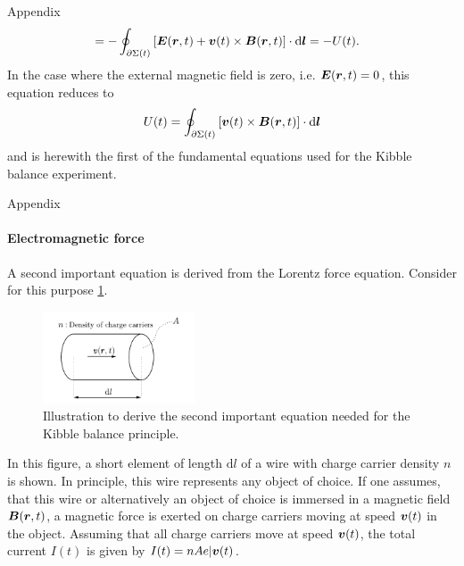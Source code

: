 \documentclass{beamer}
\begin{document}
\begin{frame}[allowframebreaks]{Appendix}
\begin{align}
\begin{aligned}
			&= -\oint_{\partial \Sigma(t)} \left[\bm{E}(\bm{r},t) + \bm{v}(t) \times \bm{B}(\bm{r},t)\right]\cdot \mathrm{d}\bm{l} = -U(t).
		\end{aligned}
	\end{align} In the case where the external magnetic field is zero, i.e. $\bm{E}(\bm{r},t) = 0$, this equation reduces to \begin{equation}\label{eq:watt_bal_fund_eq_1}
	U(t) = \oint_{\partial \Sigma(t)} \left[\bm{v}(t) \times \bm{B}(\bm{r},t)\right]\cdot \mathrm{d}\bm{l}
	\end{equation} and is herewith the first of the fundamental equations used for the Kibble balance experiment.
\end{frame}

\begin{frame}[allowframebreaks]{Appendix}
\framesubtitle{Electromagnetic force}
\justifying
	A second important equation is derived from the Lorentz force equation. Consider for this purpose \cref{fig:lorentzforceeq}. \begin{figure}[h]
	\centering
	\includegraphics[width=0.4\textwidth]{figures/lorentzforceeq.pdf}
	\caption{Illustration to derive the second important equation needed for the Kibble balance principle.}
	\label{fig:lorentzforceeq}
	\end{figure}
	In this figure, a short element of length $\mathrm{d}l$ of a wire with charge carrier density $n$ is shown. In principle, this wire represents any object of choice. If one assumes, that this wire or alternatively an object of choice is immersed in a magnetic field $\bm{B}(\bm{r},t)$, a magnetic force is exerted on charge carriers moving at speed $\bm{v}(t)$ in the object. Assuming that all charge carriers move at speed $\bm{v}(t)$, the total current $I(t)$ is given by $I(t) = nAe|\bm{v}(t)$. 
 
 \pagebreak 
 

\end{frame}
\end{document}
